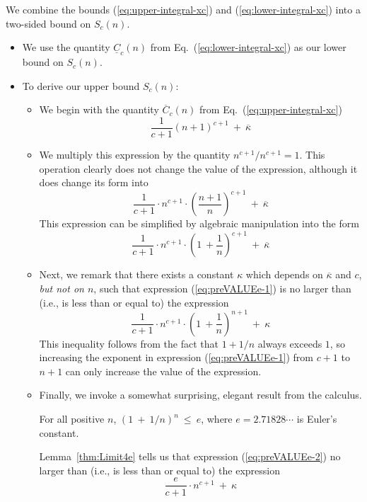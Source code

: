 \noindent
We combine the bounds (\ref{eq:upper-integral-xc}) and (\ref{eq:lower-integral-xc}) into a two-sided bound on $S_c(n)$.
\begin{itemize}
\item
We use the quantity $\underline{C}_c(n)$ from Eq.~(\ref{eq:lower-integral-xc}) as our lower bound on $S_c(n)$.
\medskip\item
To derive our upper bound $S_c(n)$:
  \begin{itemize}
  \item
We begin with the quantity $\overline{C}_c(n)$ from Eq.~(\ref{eq:upper-integral-xc})
\[ \frac{1}{c+1} (n+1)^{c+1} \ + \ \overline{\kappa} \]
  \medskip\item
We multiply this expression by the quantity $n^{c+1}/n^{c+1} = 1$.  This operation clearly does not change the value of the expression, although it does change its form into
\[ \frac{1}{c+1} \cdot n^{c+1} \cdot \left( \frac{n+1}{n} \right)^{c+1}  \ + \ \overline{\kappa} \]
This expression can be simplified by algebraic manipulation into the form
\begin{equation}
\label{eq:preVALUEe-1}
\frac{1}{c+1} \cdot n^{c+1} \cdot \left( 1 \ + \frac{1}{n} \right)^{c+1} \ + \ \overline{\kappa}
\end{equation}

  \medskip\item
Next, we remark that there exists a constant $\kappa$ which depends on $\overline{\kappa}$ and $c$, {\em but not on $n$}, such that expression (\ref{eq:preVALUEe-1}) is no larger than (i.e., is less than or equal to) the expression
\begin{equation}
\label{eq:preVALUEe-2}
\frac{1}{c+1} \cdot n^{c+1} \cdot \left( 1 \ + \frac{1}{n} \right)^{n+1} \ + \ \kappa
\end{equation}
This inequality follows from the fact that $1 + 1/n$ always exceeds $1$, so increasing the exponent in expression (\ref{eq:preVALUEe-1}) from $c+1$ to $n+1$ can only increase the value of the expression.

\medskip\item
Finally, we invoke a somewhat surprising, elegant result from the calculus.

\begin{lemma}
\label{thm:Limit4e}
For all positive $n$, $(1 \ + \ 1/n)^n \ \leq \ e$, where $e = 2.71828\cdots$ is Euler's constant. 
\end{lemma}

Lemma~\ref{thm:Limit4e} tells us that expression (\ref{eq:preVALUEe-2}) no larger than (i.e., is less than or equal to) the expression
\begin{equation}
\label{eq:preVALUEe-3}
\frac{e}{c+1} \cdot n^{c+1} \ + \ \kappa
\end{equation}
  \end{itemize}
\end{itemize}

